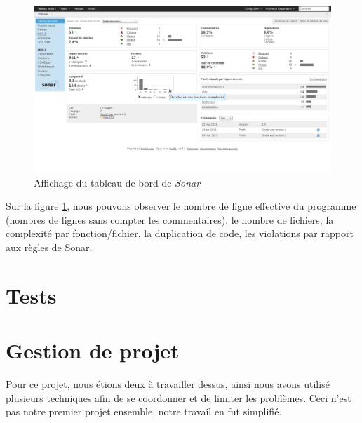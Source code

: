 \documentclass[12pt,a4paper,openany]{book}
\begin{document}
	\begin{figure}[H]
		\centering
		\includegraphics[width=18cm]{screens/sonar.png}
		\caption{Affichage du tableau de bord de \textit{Sonar}}
		\label{fig:sonar}
	\end{figure}
	Sur la figure \ref{fig:sonar}, nous pouvons observer le nombre de ligne effective du programme (nombres de lignes sans compter
	les commentaires), le nombre de fichiers, la complexité par fonction/fichier, la duplication de code, les violations par rapport aux règles de Sonar. 

	\chapter{Tests}
	\chapter{Gestion de projet}
	Pour ce projet, nous étions deux à travailler dessus, ainsi nous avons utilisé plusieurs techniques afin de se coordonner et de limiter les problèmes. Ceci n'est pas notre premier projet ensemble, notre travail en fut simplifié.
\end{document}
